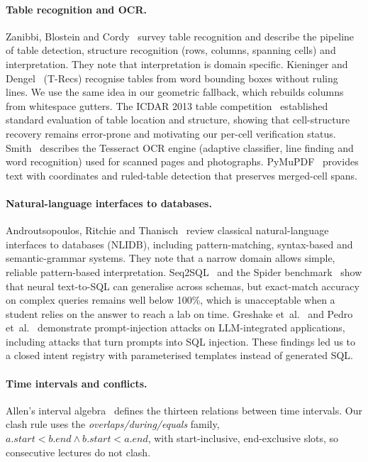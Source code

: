 \paragraph{Table recognition and OCR.}
Zanibbi, Blostein and Cordy~\cite{zanibbi2004} survey table recognition and describe the pipeline of
table detection, structure recognition (rows, columns, spanning cells) and interpretation. They note
that interpretation is domain specific. Kieninger and Dengel~\cite{kieninger1998} (T-Recs) recognise
tables from word bounding boxes without ruling lines. We use the same idea in our geometric
fallback, which rebuilds columns from whitespace gutters. The ICDAR 2013 table competition~\cite{gobel2013}
established standard evaluation of table location and structure, showing that cell-structure recovery
remains error-prone and motivating our per-cell verification status. Smith~\cite{smith2007} describes
the Tesseract OCR engine (adaptive classifier, line finding and word recognition) used for scanned
pages and photographs. PyMuPDF~\cite{pymupdf} provides text with coordinates and ruled-table detection
that preserves merged-cell spans.

\paragraph{Natural-language interfaces to databases.}
Androutsopoulos, Ritchie and Thanisch~\cite{androutsopoulos1995} review classical natural-language
interfaces to databases (NLIDB), including pattern-matching, syntax-based and semantic-grammar
systems. They note that a narrow domain allows simple, reliable pattern-based interpretation. Seq2SQL~\cite{zhong2017}
and the Spider benchmark~\cite{yu2018} show that neural text-to-SQL can generalise across schemas, but
exact-match accuracy on complex queries remains well below 100\%, which is unacceptable when a student
relies on the answer to reach a lab on time. Greshake et~al.~\cite{greshake2023} and Pedro
et~al.~\cite{pedro2023} demonstrate prompt-injection attacks on LLM-integrated applications, including
attacks that turn prompts into SQL injection. These findings led us to a closed intent registry with
parameterised templates instead of generated SQL.

\paragraph{Time intervals and conflicts.}
Allen's interval algebra~\cite{allen1983} defines the thirteen relations between time intervals. Our
clash rule uses the \emph{overlaps/during/equals} family, $a.\mathit{start} < b.\mathit{end} \wedge
b.\mathit{start} < a.\mathit{end}$, with start-inclusive, end-exclusive slots, so consecutive lectures do
not clash.

